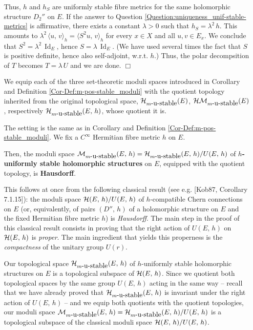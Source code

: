 \documentclass[12pt]{article}
\begin{document}
  Thus, $h$ and $h_S$ are uniformly stable fibre metrics for the same holomorphic structure $D_2''$ on $E$. If the answer to Question \ref{Question:uniqueness_unif-stable-metrics} is affirmative, there exists a constant $\lambda>0$ such that $h_S = \lambda^2\,h$. This amounts to $\lambda^2\,\langle u,\,v\rangle_h = \langle S^2u,\,v\rangle_h$ for every $x\in X$ and all $u,v\in E_x$. We conclude that $S^2 =\lambda^2\,\operatorname{Id}_E$, hence $S =\lambda\,\operatorname{Id}_E$. (We have used several times the fact that $S$ is positive definite, hence also self-adjoint, w.r.t. $h$.) Thus, the polar decompsition of $T$ becomes $T = \lambda\,U$ and we are done. \hfill $\Box$


\vspace{2ex}

We equip each of the three set-theoretic moduli spaces introduced in Corollary and Definition \ref{Cor-Def:m-pos-stable_moduli} with the quotient topology inherited from the original topological space, ${\cal H}_{m\mbox{-u-stable}}(E)$, ${\cal HM}_{m\mbox{-u-stable}}(E)$, respectively $ {\cal H}_{m\mbox{-u-stable}}(E,\,h)$, whose quotient it is.

\begin{Prop}\label{Prop:Hausdorff_moduli_h-unif-stable} The setting is the same as in Corollary and Definition \ref{Cor-Def:m-pos-stable_moduli}. We fix a $C^\infty$ Hermitian fibre metric $h$ on $E$.

  Then, the moduli space ${\cal M}_{m\mbox{-u-stable}}(E,\,h)={\cal H}_{m\mbox{-u-stable}}(E,\,h)/U(E,\,h)$ of {\bf $h$-uniformly stable holomorphic structures} on $E$, equipped with the quotient topology, is {\bf Hausdorff}. 


\end{Prop}  

 This follows at once from the following classical result (see e.g. [Kob87, Corollary 7.1.15]): the moduli space ${\cal H}(E,\,h)/U(E,\,h)$ of $h$-compatible Chern connections on $E$ (or, equivalently, of pairs $(D'',\,h)$ of a holomorphic structure on $E$ and the fixed Hermitian fibre metric $h$) is {\it Hausdorff}. The main step in the proof of this classical result consists in proving that the right action of $U(E,\,h)$ on ${\cal H}(E,\,h)$ is {\it proper}. The main ingredient that yields this properness is the {\it compactness} of the unitary group $U(r)$.

Our topological space ${\cal H}_{m\mbox{-u-stable}}(E,\,h)$ of $h$-uniformly stable holomorphic structures on $E$ is a topological subspace of ${\cal H}(E,\,h)$. Since we quotient both topological spaces by the same group $U(E,\,h)$ acting in the same way -- recall that we have already proved that ${\cal H}_{m\mbox{-u-stable}}(E,\,h)$ is invariant under the right action of $U(E,\,h)$ -- and we equip both quotients with the quotient topologies, our moduli space ${\cal M}_{m\mbox{-u-stable}}(E,\,h)={\cal H}_{m\mbox{-u-stable}}(E,\,h)/U(E,\,h)$ is a topological subspace of the classical moduli space ${\cal H}(E,\,h)/U(E,\,h)$.
\end{document}
